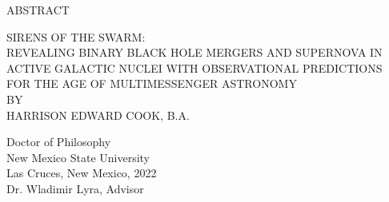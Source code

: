 \begin{center}
ABSTRACT
\end{center}

\bigskip

\begin{center}
SIRENS OF THE SWARM:\\
REVEALING BINARY BLACK HOLE MERGERS AND SUPERNOVA IN ACTIVE GALACTIC NUCLEI WITH OBSERVATIONAL PREDICTIONS FOR THE AGE OF MULTIMESSENGER ASTRONOMY \\
\bigskip
BY\\
\bigskip
HARRISON EDWARD COOK, B.A.
\end{center}

\bigskip

\begin{center}
Doctor of Philosophy\\
New Mexico State University\\
Las Cruces, New Mexico, 2022\\
Dr. Wladimir Lyra, Advisor
\end{center}

\bigskip
\bigskip

